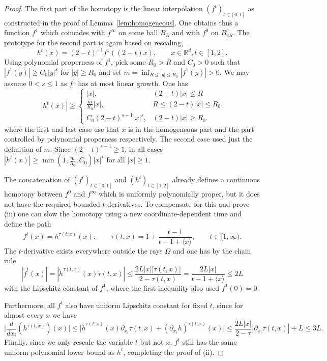 \documentclass[12pt]{amsart}
\newcommand{\RM}{{\mathbb R}}
\newcommand{\pdv}{\partial}
\begin{document}
\begin{proof}
The first part of the homotopy is the linear interpolation $(f^t)_{t\in [0,1]}$ as constructed in the proof of Lemma~\ref{lem:homogeneous}. One obtains thus a function $f^1$ which coincides with $f^\infty$ on some ball $B_R$ and with $f^0$ on $B_{2R}^c$. The prototype for the second part is again based on rescaling, $$h^t(x)=(2-t)^{-1}f^1((2-t)x), \qquad x\in \RM^d, t\in [1,2].$$ Using polynomial properness of $f^1$, pick some $R_0>R$ and $C_0>0$ such that $|f^1(y)|\geq C_0 |y|^s$ for $|y|\geq R_0$ and set $m=\inf_{R\leq |y|\leq R_0} |f^1(y)|>0$. We may assume $0<s\leq 1$ as $f^1$ has at most linear growth. One has
$$|h^t(x)|\geq\begin{cases}
|x|, & (2-t)|x| \leq R\\
\frac{m}{R_0}|x|, & R \leq (2-t)|x|\leq R_0\\
C_0(2-t)^{s-1} |x|^s, & (2-t)|x|\geq R_0.
\end{cases}$$
where the first and last case use that $x$ is in the homogeneous part and the part controlled by polynomial properness respectively. 
The second case used just the definition of $m$. Since $(2-t)^{s-1}\geq 1$, in all cases $|h^t(x)|\geq \min(1,\frac{m}{R_0},C_0)|x|^s$ for all $|x|\geq 1$.

The concatenation of $(f^t)_{t\in [0,1]}$ and $(h^t)_{t\in [1,2]}$ already defines a continuous homotopy between $f^0$ and $f^\infty$ which is uniformly polynomially proper, but it does not have the required bounded $t$-derivatives. To compensate for this and prove (iii) one can slow the homotopy using a new coordinate-dependent time and define the path 
$$f^{t}(x) = h^{\tau(t,x)}(x), \qquad \tau(t,x)=1 + \frac{t-1}{t-1+\langle x\rangle}, \qquad t\in [1,\infty).$$ The $t$-derivative exists everywhere outside the rays $\Omega$ and one has by the chain rule
$$|\dot{f}^{t}(x)| = | \dot{h}^{\tau(t,x)}(x) \dot{\tau}(t,x)|\leq \frac{2L |x| |\dot{\tau}(t,x)|}{2-\tau(t,x)}= \frac{2L |x|}{t-1 + \langle x\rangle} \leq 2 L$$
with the Lipschitz constant of $f^1$, where the first inequality also used $f^1(0)=0$. 

Furthermore, all $f^{t}$ also have uniform Lipschitz constant for fixed $t$, since for almost every $x$ we have
$$\bigg|\frac{d}{dx_i}\left(h^{\tau(t,x)}\right)(x)\bigg|
\leq \bigg|\dot{h}^{\tau(t,x)}(x)\pdv_{x_i} \tau(t,x)+ (\pdv_{x_i} h)^{\tau(t,x)}(x)\bigg|\leq \frac{2L|x|}{2-\tau}|\pdv_{x_i} \tau(t,x)|  + L \leq 3L.$$
Finally, since we only rescale the variable $t$ but not $x$, $f^t$ still has the same uniform polynomial lower bound as $h^t$, completing the proof of (ii).
\end{proof}
\end{document}
